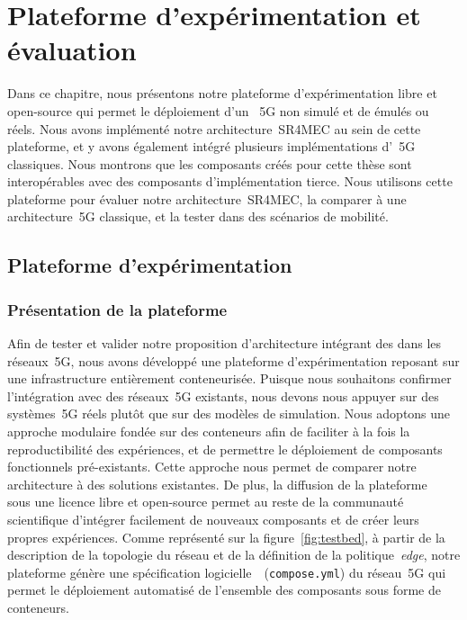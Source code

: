 \documentclass[../main.tex]{subfiles}
\begin{document}
\initSubfile[5]

\chapter{Plateforme d'expérimentation et évaluation}
\label{ch:testbed}

\begin{chapterHeader}
Dans ce chapitre, nous présentons notre plateforme d’expérimentation libre et open-source qui permet le déploiement d’un ~5G non simulé et de  émulés ou réels.
Nous avons implémenté notre architecture~SR4MEC au sein de cette plateforme, et y avons également intégré plusieurs implémentations d’~5G classiques.
Nous montrons que les composants créés pour cette thèse sont interopérables avec des composants d’implémentation tierce.
Nous utilisons cette plateforme pour évaluer notre architecture~SR4MEC, la comparer à une architecture~5G classique, et la tester dans des scénarios de mobilité.
\end{chapterHeader}

\section{Plateforme d’expérimentation}
\subsection{Présentation de la plateforme}
Afin de tester et valider notre proposition d’architecture intégrant des  dans les réseaux~5G, nous avons développé une plateforme d’expérimentation reposant sur une infrastructure entièrement conteneurisée.
Puisque nous souhaitons confirmer l’intégration avec des réseaux~5G existants, nous devons nous appuyer sur des systèmes~5G réels plutôt que sur des modèles de simulation.
Nous adoptons une approche modulaire fondée sur des conteneurs afin de faciliter à la fois la reproductibilité des expériences, et de permettre le déploiement de composants fonctionnels pré-existants.
Cette approche nous permet de comparer notre architecture à des solutions existantes.
De plus, la diffusion de la plateforme~\cite{NEXTMN} sous une licence libre et open-source permet au reste de la communauté scientifique d’intégrer facilement de nouveaux composants et de créer leurs propres expériences.
Comme représenté sur la figure~\ref{fig:testbed}, à partir de la description de la topologie du réseau et de la définition de la politique~\textit{edge}, notre plateforme génère une spécification logicielle~\cite{COMPOSE.SPEC}~(\texttt{compose.yml}) du réseau~5G qui permet le déploiement automatisé de l’ensemble des composants sous forme de conteneurs.
\end{document}

